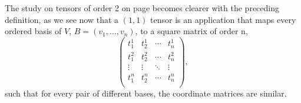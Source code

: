 The study on tensors of order 2 on page \pageref{sub:order2} becomes clearer with the preceding definition, as we see now that a $(1,1)$ tensor is an application that maps every ordered basis of $V$, $B=(v_1, \dots, v_n)$, to a square matrix of order n,
\[
	\begin{pmatrix}
	t^1_1 & t^1_2 & \cdots & t^1_n \\
	t^2_1 & t^2_2 & \cdots & t^2_n \\
	\vdots & \vdots & \ddots & \vdots \\
	t^n_1 & t^n_2 & \cdots & t^n_n \\
	\end{pmatrix},
\]
such that for every pair of different bases, the coordinate matrices are similar.
	

